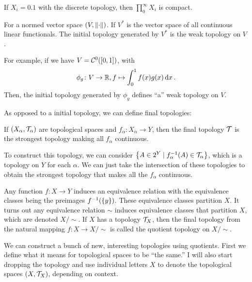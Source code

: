 \begin{example}
    If $X_i = \qty{0, 1}$ with the discrete topology, then $\prod_0^\infty X_i$ is compact.
\end{example}

\begin{definition}
    For a normed vector space $(V, \norm{\cdot})$. If $V^*$ is the vector space of all continuous linear functionals. The initial topology generated by $V^*$ is the weak topology on $V$.    
\end{definition}

\begin{example}
    For example, if we have $V = \mathcal C^0([0, 1])$, with \[\phi_g\colon V \to \mathbb R, f \mapsto \int_0^1 f(x)g(x) \dd{x}.\] Then, the initial topology generated by $\phi_g$ defines ``a'' weak topology on $V$.
\end{example}

As opposed to a initial topology, we can define final topologies:
\begin{definition}
    If $(X_\alpha, \mathcal T_\alpha)$ are topological spaces and $f_\alpha \colon X_\alpha \to Y$, then the final topology $\mathcal T$ is the strongest topology making all $f_\alpha$ continuous.
\end{definition}

To construct this topology, we can consider $\qty{A \in 2^Y \mid f_\alpha^{-1}(A) \in \mathcal T_\alpha}$, which is a topology on $Y$ for each $\alpha$. We can just take the intersection of these topologies to obtain the strongest topology that makes all the $f_\alpha$ continuous.

\begin{example}
    Any function $f \colon X \to Y$ induces an equivalence relation with the equivalence classes being the preimages $f^{-1}(\qty{y})$. These equivalence classes partition $X$. It turns out any equivalence relation $\sim$ induces equivalence classes that partition $X$, which are denoted $X/\!\sim$. If $X$ has a topology $\mathcal T_X$, then the final topology from the natural mapping $f \colon X \to X/\!\sim$ is called the quotient topology on $X/\!\sim$.
\end{example}

We can construct a bunch of new, interesting topologies using quotients. First we define what it means for topological spaces to be ``the same.'' I will also start dropping the topology and use individual letters $X$ to denote the topological spaces $(X, \mathcal T_X)$, depending on context.


